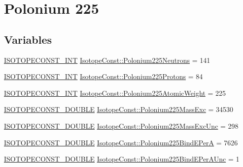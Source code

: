 \hypertarget{group___isotope_const-_polonium-_po225}{}\section{Polonium 225}
\label{group___isotope_const-_polonium-_po225}
\subsection*{Variables}
\begin{DoxyCompactItemize}
\item 
\mbox{\hyperlink{group___isotope_const-_macros_ga5f18360b3e99483a35c32d789e62621c}{I\+S\+O\+T\+O\+P\+E\+C\+O\+N\+S\+T\+\_\+\+I\+NT}} \mbox{\hyperlink{group___isotope_const-_polonium-_po225_ga0b874b7ba6405e30259bb3f525eac558}{Isotope\+Const\+::\+Polonium225\+Neutrons}} = 141
\item 
\mbox{\hyperlink{group___isotope_const-_macros_ga5f18360b3e99483a35c32d789e62621c}{I\+S\+O\+T\+O\+P\+E\+C\+O\+N\+S\+T\+\_\+\+I\+NT}} \mbox{\hyperlink{group___isotope_const-_polonium-_po225_ga2cb0171c4261886fc98ab849a0314a5b}{Isotope\+Const\+::\+Polonium225\+Protons}} = 84
\item 
\mbox{\hyperlink{group___isotope_const-_macros_ga5f18360b3e99483a35c32d789e62621c}{I\+S\+O\+T\+O\+P\+E\+C\+O\+N\+S\+T\+\_\+\+I\+NT}} \mbox{\hyperlink{group___isotope_const-_polonium-_po225_ga29b6969d532666018200f16264872975}{Isotope\+Const\+::\+Polonium225\+Atomic\+Weight}} = 225
\item 
\mbox{\hyperlink{group___isotope_const-_macros_ga8f45a7272ce02c0b4c65c44636ed719a}{I\+S\+O\+T\+O\+P\+E\+C\+O\+N\+S\+T\+\_\+\+D\+O\+U\+B\+LE}} \mbox{\hyperlink{group___isotope_const-_polonium-_po225_ga697c6e530fc67d606d2932c96509e110}{Isotope\+Const\+::\+Polonium225\+Mass\+Exc}} = 34530
\item 
\mbox{\hyperlink{group___isotope_const-_macros_ga8f45a7272ce02c0b4c65c44636ed719a}{I\+S\+O\+T\+O\+P\+E\+C\+O\+N\+S\+T\+\_\+\+D\+O\+U\+B\+LE}} \mbox{\hyperlink{group___isotope_const-_polonium-_po225_ga474addb42d0742dcd9f17143fa4a514f}{Isotope\+Const\+::\+Polonium225\+Mass\+Exc\+Unc}} = 298
\item 
\mbox{\hyperlink{group___isotope_const-_macros_ga8f45a7272ce02c0b4c65c44636ed719a}{I\+S\+O\+T\+O\+P\+E\+C\+O\+N\+S\+T\+\_\+\+D\+O\+U\+B\+LE}} \mbox{\hyperlink{group___isotope_const-_polonium-_po225_gaba5a58122d5582736ff6377154a9250e}{Isotope\+Const\+::\+Polonium225\+Bind\+E\+PerA}} = 7626
\item 
\mbox{\hyperlink{group___isotope_const-_macros_ga8f45a7272ce02c0b4c65c44636ed719a}{I\+S\+O\+T\+O\+P\+E\+C\+O\+N\+S\+T\+\_\+\+D\+O\+U\+B\+LE}} \mbox{\hyperlink{group___isotope_const-_polonium-_po225_gad6200ab17ef820fa613fc9658c6e9d82}{Isotope\+Const\+::\+Polonium225\+Bind\+E\+Per\+A\+Unc}} = 1

\end{DoxyCompactItemize}
